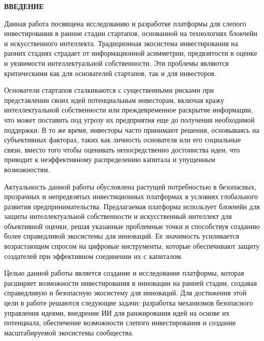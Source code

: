 \documentclass[
    candidate, %
    subf, %
]{disser}
\begin{document}


\renewcommand{\contentsname}{\centerline{\large СОДЕРЖАНИЕ}}
\tableofcontents

\newpage
\begin{center}
  \textbf{\large ВВЕДЕНИЕ}
\end{center}

Данная работа посвящена исследованию и разработке платформы для слепого инвестирования в ранние стадии стартапов, основанной на технологиях блокчейн и искусственного интеллекта. Традиционная экосистема инвестирования на ранних стадиях страдает от информационной асимметрии, предвзятости в оценке и уязвимости интеллектуальной собственности. Эти проблемы являются критическими как для основателей стартапов, так и для инвесторов.

Основатели стартапов сталкиваются с существенными рисками при представлении своих идей потенциальным инвесторам, включая кражу интеллектуальной собственности или преждевременное раскрытие информации, что может поставить под угрозу их предприятия еще до получения необходимой поддержки. В то же время, инвесторы часто принимают решения, основываясь на субъективных факторах, таких как личность основателя или его социальные связи, вместо того чтобы оценивать непосредственно достоинства идеи, что приводит к неэффективному распределению капитала и упущенным возможностям.

Актуальность данной работы обусловлена растущей потребностью в безопасных, прозрачных и непредвзятых инвестиционных платформах в условиях глобального развития предпринимательства. Предлагаемая платформа использует блокчейн для защиты интеллектуальной собственности и искусственный интеллект для объективной оценки, решая указанные проблемные точки и способствуя созданию более справедливой экосистемы для инноваций. Ее значимость усиливается возрастающим спросом на цифровые инструменты, которые обеспечивают защиту создателей при эффективном соединении их с капиталом.

Целью данной работы является создание и исследование платформы, которая расширяет возможности инвестирования в инновации на ранней стадии, создавая справедливую и безопасную экосистему для инноваций. Для достижения этой цели в работе решаются следующие задачи: разработка механизмов безопасного управления идеями, внедрение ИИ для ранжирования идей на основе их потенциала, обеспечение возможности слепого инвестирования и создание масштабируемой экосистемы сообщества.
\end{document}
